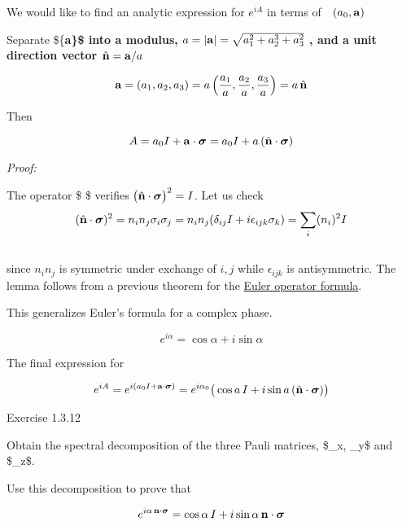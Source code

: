\documentclass[11pt]{article}
\begin{document}
We would like to find an analytic expression for \(e^{iA}\) in terms of
\(~~
(a_0,{\bf a})\)

    Separate \$\{\bf a\}\$ into a modulus,
\(a=|{\bf a}|=\sqrt{a_1^2+a_2^3+a_3^2}~\), and a unit direction vector
\(\hat{\bf n} = {\bf a}/a\)

\[{\bf a} = (a_1,a_2,a_3) = a \left( \frac{a_1}{a},\frac{a_2}{a},\frac{a_3}{a}\right) =  a\, \hat{\bf n}\]

Then

\[
A = a_0 I +  {\bf a} \cdot \boldsymbol{\sigma} =  a_0 I + a\, (\hat{\bf n} \cdot \boldsymbol{\sigma})
\]

    

    \emph{Proof:}

The operator \$ \cdot  \boldsymbol{\sigma}\$ verifies
\(\big(\hat{\bf n}\cdot  \boldsymbol{\sigma}\big)^2 = I\). Let us check
\[
(\hat{\bf n} \cdot \boldsymbol{\sigma})^2 = n_i n_j \sigma_i \sigma_j =
n_i n_j (\delta_{ij} I + i \epsilon_{ijk} \sigma_k) = \sum_i (n_i)^2 I 
\]\\
since \(n_in_j\) is symmetric under exchange of \(i,j\) while
\(\epsilon_{ijk}\) is antisymmetric. The lemma follows from a previous
theorem for the \hyperref[euler_op]{Euler operator formula}.

    This generalizes Euler's formula for a complex phase.

\[ e^{i\alpha} = \cos\alpha + i \sin\alpha \]

    The final expression for

\[
e^{iA} = e^{i(a_0 I + {\bf a} \cdot \boldsymbol{\sigma}) } = e^{i\alpha_0} \big(\cos a\, I + i \sin a \,(\hat{\bf n} \cdot  \boldsymbol{\sigma}) \big)
\]

    Exercise 1.3.12

Obtain the spectral decomposition of the three Pauli matrices,
\$\sigma\_x, \sigma\_y\$ and \$\sigma\_z\$.

Use this decomposition to prove that

\[
e^{i \alpha\,  {\bf n}\cdot\boldsymbol{\sigma}} = \cos \alpha \, I + i \sin \alpha \, {\bf n}\cdot\boldsymbol{\sigma}
\]
\end{document}
